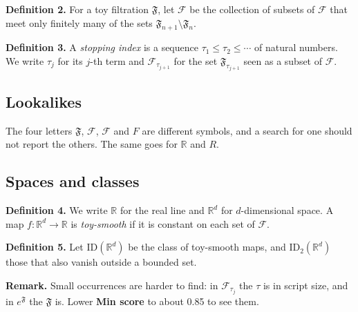 \documentclass[11pt]{article}
\begin{document}
\medskip\noindent\textbf{Definition 2.}\label{def:cal} For a toy filtration
$\mathfrak{F}$, let $\mathcal{F}$ be the collection of subsets of
$\mathscr{F}$ that meet only finitely many of the sets
$\mathfrak{F}_{n+1} \setminus \mathfrak{F}_n$.

\medskip\noindent\textbf{Definition 3.}\label{def:tau} A \emph{stopping
index} is a sequence $\tau_1 \le \tau_2 \le \cdots$ of natural numbers. We
write $\tau_j$ for its $j$-th term and $\mathscr{F}_{\tau_{j+1}}$ for the
set $\mathfrak{F}_{\tau_{j+1}}$ seen as a subset of $\mathscr{F}$.

\subsection*{Lookalikes}
The four letters $\mathfrak{F}$, $\mathscr{F}$, $\mathcal{F}$ and $F$ are
different symbols, and a search for one should not report the others.
The same goes for $\mathbb{R}$ and $R$.

\newpage
\subsection*{Spaces and classes}
\textbf{Definition 4.}\label{def:R} We write $\mathbb{R}$ for the real line
and $\mathbb{R}^d$ for $d$-dimensional space. A map
$f \colon \mathbb{R}^d \to \mathbb{R}$ is \emph{toy-smooth} if it is
constant on each set of $\mathcal{F}$.

\medskip\noindent\textbf{Definition 5.}\label{def:ID} Let
$\mathrm{ID}(\mathbb{R}^d)$ be the class of toy-smooth maps, and
$\mathrm{ID}_2(\mathbb{R}^d)$ those that also vanish outside a bounded set.

\medskip\noindent\textbf{Remark.} Small occurrences are harder to find:
in $\mathscr{F}_{\tau_j}$ the $\tau$ is in script size, and in
$e^{\mathfrak{F}}$ the $\mathfrak{F}$ is. Lower \textbf{Min score} to about
0.85 to see them.
\end{document}
